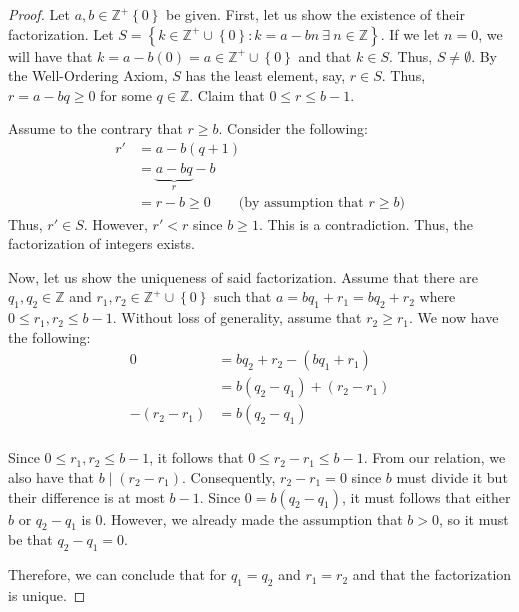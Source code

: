 \begin{proof}
    Let \(a, b \in \mathbb{Z}^+\left\{0\right\}\) be given. First, let us show the existence of their factorization. Let \(S = \left\{k \in \mathbb{Z}^+ \cup \left\{0\right\} : k = a - bn \ \exists \ n \in \mathbb{Z}\right\}\). If we let \(n = 0\), we will have that \(k = a - b(0) = a \in \mathbb{Z}^+ \cup \left\{0\right\}\) and that \(k \in S\). Thus, \(S \neq \emptyset\). By the Well-Ordering Axiom, \(S\) has the least element, say, \(r \in S\). Thus, \(r = a - bq \geq 0\) for some \(q \in \mathbb{Z}\). Claim that \(0 \leq r \leq b-1\).

    Assume to the contrary that \(r \geq b\). Consider the following:
    \[
    \begin{aligned}
        r' &= a - b(q + 1) \\
           &= \underbrace{a - bq}_{r} - b \\
           &= r - b \geq 0 \qquad \text{(by assumption that \(r \geq b\))}
    \end{aligned}
    \]
    Thus, \(r' \in S\). However, \(r' < r\) since \(b \geq 1\). This is a contradiction. Thus, the factorization of integers exists.

    Now, let us show the uniqueness of said factorization. Assume that there are \(q_1, q_2 \in \mathbb{Z}\) and \(r_1, r_2 \in \mathbb{Z}^+ \cup \left\{0\right\}\) such that \(a = bq_1 + r_1 = bq_2 + r_2\) where \(0 \leq r_1, r_2 \leq b-1\). Without loss of generality, assume that \(r_2 \geq r_1\). We now have the following:
    \[
    \begin{aligned}
        0 &= bq_2 + r_2 - (bq_1 + r_1) \\
          &= b(q_2 - q_1) + (r_2 - r_1) \\
        -(r_2 - r_1) &= b(q_2 - q_1) \\
    \end{aligned}
    \]

    Since \(0 \leq r_1, r_2 \leq b-1\), it follows that \(0 \leq r_2 - r_1 \leq b-1\). From our relation, we also have that \(b \mid (r_2 - r_1)\). Consequently, \(r_2 - r_1 = 0\) since \(b\) must divide it but their difference is at most \(b-1\). Since \(0 = b(q_2 - q_1)\), it must follows that either \(b\) or \(q_2 - q_1\) is 0. However, we already made the assumption that \(b > 0\), so it must be that \(q_2 - q_1 = 0\).

    Therefore, we can conclude that for \(q_1 = q_2\) and \(r_1 = r_2\) and that the factorization is unique.
\end{proof}

